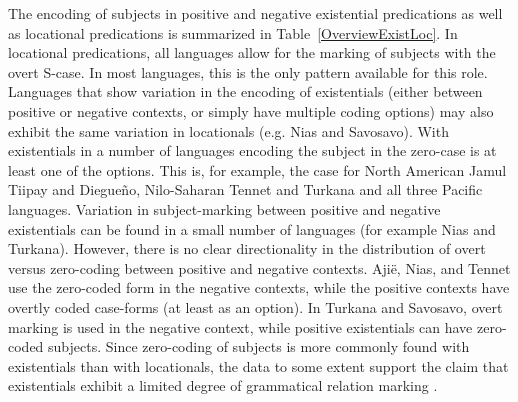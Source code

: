 
The encoding of subjects in positive and negative existential predications as well as locational predications is summarized in Table~\ref{OverviewExistLoc}. 
In locational predications, all languages allow for the marking of subjects with the overt S-case. 
In most languages, this is the only pattern available for this role. 
Languages that show variation in the encoding of existentials (either between positive or negative contexts, or simply have multiple coding options) may also exhibit the same variation in locationals (e.g. Nias and Savosavo). 
With existentials in a number of languages encoding the subject in the zero-case is at least one of the options. 
This is, for example, the case for North American Jamul Tiipay and Diegue\~no, Nilo-Saharan Tennet and Turkana and all three Pacific languages. 
Variation in subject-marking between positive and negative existentials can be found in a small number of languages (for example Nias and Turkana). 
However, there is no clear directionality in the distribution of overt versus zero-coding between positive and negative contexts. 
Aji\"e, Nias, and Tennet use the zero-coded form in the negative contexts, while the positive contexts have overtly coded case-forms (at least as an option). 
In Turkana and Savosavo, overt marking is used in the negative context, while positive existentials can have zero-coded subjects. 
Since zero-coding of subjects is more commonly found with existentials than with locationals, the data to some extent support the claim that existentials exhibit a limited degree of grammatical relation marking \citep[123]{Payne:1997}.


